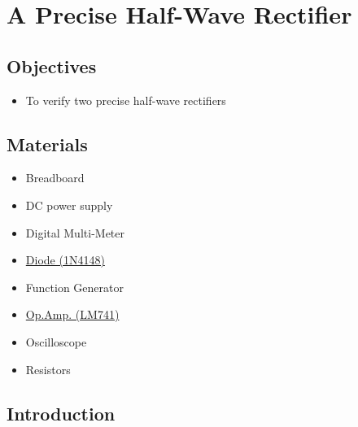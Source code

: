 \chapter{A Precise Half-Wave Rectifier}


\section{Objectives}
\begin{itemize}
    \item To verify two precise half-wave rectifiers
\end{itemize}

\section{Materials}
\begin{itemize}
    \item Breadboard
    \item DC power supply
    \item Digital Multi-Meter
    \item \hyperref[1N4148]{Diode (1N4148)}
    \item Function Generator
    \item \hyperref[LM741_1]{Op.Amp. (LM741)}
    \item Oscilloscope
    \item Resistors
\end{itemize}

\section{Introduction}

